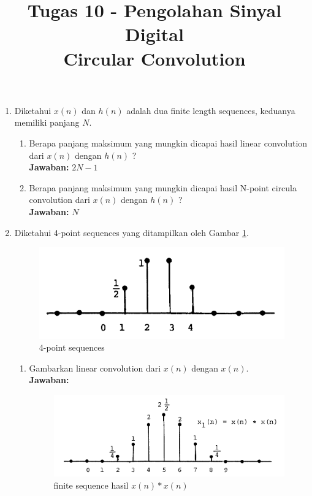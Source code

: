 \documentclass[12pt,a4paper]{article}
\title{Tugas 10 - Pengolahan Sinyal Digital\\
	Circular Convolution}
\date{}
\begin{document}
	\maketitle
	\date{}
	\begin{enumerate}
		\item Diketahui $ x(n) $ dan $ h(n) $ adalah dua finite length sequences, keduanya memiliki panjang $ N $.
		\begin{enumerate}
			\item Berapa panjang maksimum yang mungkin dicapai hasil linear convolution dari $ x(n) $ dengan $ h(n) $ ?\\
			\textbf{Jawaban:} $ 2N - 1 $
			\item Berapa panjang maksimum yang mungkin dicapai hasil N-point circula convolution dari $ x(n) $ dengan $ h(n) $ ?\\
			\textbf{Jawaban:} $ N $
		\end{enumerate}
		\item Diketahui 4-point sequences yang ditampilkan oleh Gambar \ref{fig:img01}.
		
		\begin{figure}[H]
			\centering
			\includegraphics[width=0.7\linewidth]{img/img01}
			\caption{4-point sequences}
			\label{fig:img01}
		\end{figure}
	
		\begin{enumerate}
			\item\label{a} Gambarkan linear convolution dari $ x(n) $ dengan $ x(n) $.\\
			\textbf{Jawaban:} 
			
			\begin{figure}[H]
				\centering
				\includegraphics[width=0.7\linewidth]{img/img02}
				\caption{finite sequence hasil $ x(n) * x(n) $}
				\label{fig:img02}
			\end{figure}
			

\end{enumerate}
\end{enumerate}
\end{document}
